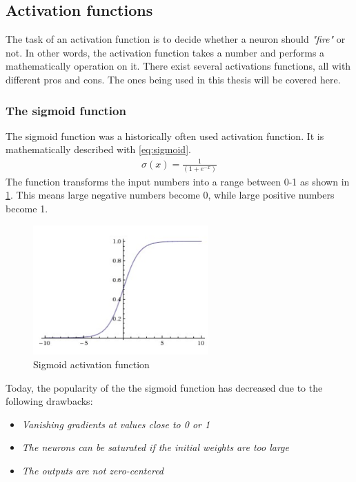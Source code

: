 \documentclass[USenglish]{ifimaster}  %
\begin{document}
\subsection{Activation functions}
The task of an activation function is to decide whether a neuron should \textit{"fire"} or not. In other words, the activation function takes a number and performs a mathematically operation on it. There exist several activations functions, all with different pros and cons. The ones being used in this thesis will be covered here.
\subsubsection{The sigmoid function}
The sigmoid function was a historically often used activation function. It is mathematically described with \cref{eq:sigmoid}.
\begin{equation}\label{eq:sigmoid}
\begin{aligned}
\sigma(x) = \frac{1}{(1 + e^{-x})}
\end{aligned}
\end{equation}
The function transforms the input numbers into a range between 0-1 as shown in \cref{fig:sigmoid}. This means large negative numbers become 0, while large positive numbers become 1.
\begin{figure}[ht]
    \centering
    \includegraphics[width=0.6\textwidth]{bilder/sigmoid_function.png}
    \caption{Sigmoid activation function \cite{website:cs231n_activation_functions}}
    \label{fig:sigmoid}
\end{figure}
Today, the popularity of the the sigmoid function has decreased due to the following drawbacks:
\begin{itemize}
    \item \textit{Vanishing gradients at values close to 0 or 1}
    \item \textit{The neurons can be saturated if the initial weights are too large}
    \item \textit{The outputs are not zero-centered}
\end{itemize}
\end{document}
